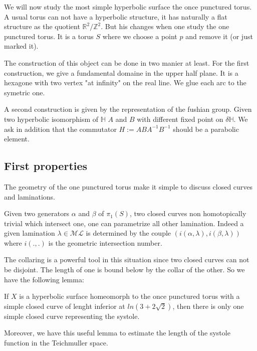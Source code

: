 We will now study the most simple hyperbolic surface the once punctured torus.
A usual torus can not have a hyperbolic structure, it has naturally a flat structure as the quotient $\mathbb{R}^2 / \mathbb{Z}^2$.
But his changes when one study the one punctured torus. It is a torus $S$ where we choose a point $p$ and remove it (or just marked it).


The construction of this object can be done in two manier at least.
For the first construction, we give a fundamental domaine in the upper half plane. It is a hexagone with two vertex "at infinity" on the real line. We glue each arc to the symetric one.



A second construction is given by the representation of the fushian group. Given two hyperbolic isomorphism of $\mathbb{H}$ $A$ and $B$ with different fixed point on $\delta \mathbb{H}$. We ask in addition that the commutator $H := ABA^{-1}B^{-1}$ should be a parabolic element.

\subsection{First properties}

The geometry of the one punctured torus make it simple to discuss closed curves and laminations.
\begin{rmq}
Given two generators $\alpha$ and $\beta$ of $\pi_1(S)$, two closed curves non homotopically trivial which intersect one, one can parametrize all other lamination.
Indeed a given lamination $\lambda \in \mathcal{ML}$ is determined by the couple $(i(\alpha,\lambda),i(\beta,\lambda))$ where $i(.,.)$ is the geometric intersection number.
\end{rmq}

The collaring is a powerful tool in this situation since two closed curves can not be disjoint. The length of one is bound below by the collar of the other. So we have the following lemma:

\begin{lem}
If $X$ is a hyperbolic surface homeomorph to the once punctured torus with a simple closed curve of lenght inferior at $ln(3+2 \sqrt{2})$, then there is only one simple closed curve representing the systole.
\end{lem}

Moreover, we have this useful lemma to estimate the length of the systole function in the Teichmuller space.

